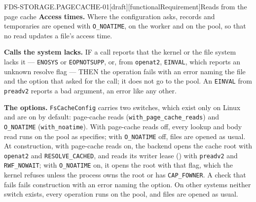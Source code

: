 \begin{requirement}{FDS-STORAGE.PAGECACHE-01}[draft][functionalRequirement]{Reads from the page cache}
  \textbf{Access times.} Where the configuration asks, records and
  temporaries are opened with \texttt{O\_NOATIME}, on the worker and on the
  pool, so that no read updates a file's access time.

  \textbf{Calls the system lacks.} IF a call reports that the kernel or the
  file system lacks it --- \texttt{ENOSYS} or \texttt{EOPNOTSUPP}, or, from
  \texttt{openat2}, \texttt{EINVAL}, which reports an unknown resolve flag
  --- THEN the operation fails with an error naming the file and the option
  that asked for the call; it does not go to the pool. An \texttt{EINVAL}
  from \texttt{preadv2} reports a bad argument, an error like any other.

  \textbf{The options.} \texttt{FsCacheConfig} carries two switches, which
  exist only on Linux and are on by default: page-cache reads
  (\texttt{with\_page\_cache\_reads}) and \texttt{O\_NOATIME}
  (\texttt{with\_noatime}). With page-cache reads off, every lookup and body
  read runs on the pool as  specifies; with
  \texttt{O\_NOATIME} off, files are opened as usual. At construction, with
  page-cache reads on, the backend opens the cache root with
  \texttt{openat2} and \texttt{RESOLVE\_CACHED}, and reads its writer lease
  () with \texttt{preadv2} and
  \texttt{RWF\_NOWAIT}; with \texttt{O\_NOATIME} on, it opens the root with
  that flag, which the kernel refuses unless the process owns the root or
  has \texttt{CAP\_FOWNER}. A check that fails fails construction with an
  error naming the option. On other systems neither switch exists, every
  operation runs on the pool, and files are opened as usual.



\end{requirement}

